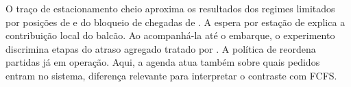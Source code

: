 O traço de estacionamento cheio aproxima os resultados dos regimes limitados por posições de \citet{guerreiro2020} e do bloqueio de chegadas de \citet{onat2026buffer}. A espera por estação de \citet{feldhoff2022} explica a contribuição local do balcão. Ao acompanhá-la até o embarque, o experimento discrimina etapas do atraso agregado tratado por \citet{preisHornung2022}. A política de \citet{halderGandhi2025} reordena partidas já em operação. Aqui, a agenda atua também sobre quais pedidos entram no sistema, diferença relevante para interpretar o contraste com FCFS.
